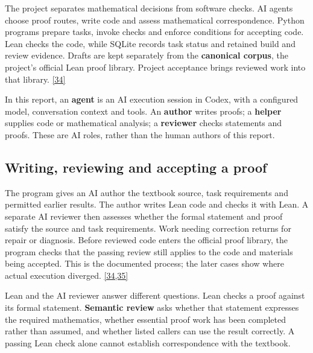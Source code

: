 The project separates mathematical decisions from software checks. AI agents choose proof routes, write code and assess mathematical correspondence. Python programs prepare tasks, invoke checks and enforce conditions for accepting code. Lean checks the code, while SQLite records task status and retained build and review evidence. Drafts are kept separately from the \textbf{canonical corpus}, the project's official Lean proof library. Project acceptance brings reviewed work into that library. \hyperlink{ref-34}{\mbox{[34]}}

In this report, an \textbf{agent} is an AI execution session in Codex, with a configured model, conversation context and tools. An \textbf{author} writes proofs; a \textbf{helper} supplies code or mathematical analysis; a \textbf{reviewer} checks statements and proofs. These are AI roles, rather than the human authors of this report.

\subsection[Writing, reviewing and accepting a proof]{\texorpdfstring{\protect\hypertarget{section-1-2}{}Writing, reviewing and accepting a proof}{Writing, reviewing and accepting a proof}}
The program gives an AI author the textbook source, task requirements and permitted earlier results. The author writes Lean code and checks it with Lean. A separate AI reviewer then assesses whether the formal statement and proof satisfy the source and task requirements. Work needing correction returns for repair or diagnosis. Before reviewed code enters the official proof library, the program checks that the passing review still applies to the code and materials being accepted. This is the documented process; the later cases show where actual execution diverged. \hyperlink{ref-34}{\mbox{[34,35]}}

Lean and the AI reviewer answer different questions. Lean checks a proof against its formal statement. \textbf{Semantic review} asks whether that statement expresses the required mathematics, whether essential proof work has been completed rather than assumed, and whether listed callers can use the result correctly. A passing Lean check alone cannot establish correspondence with the textbook.

